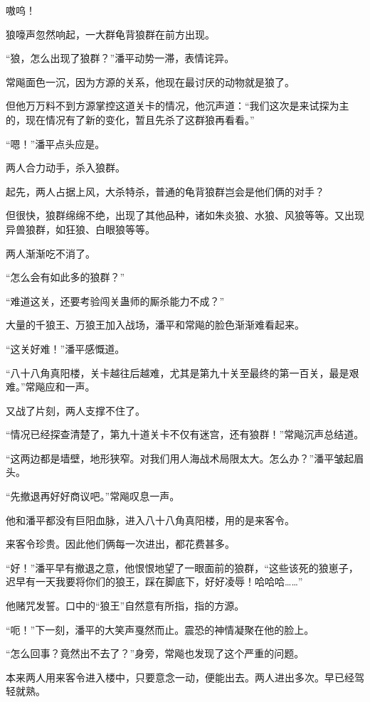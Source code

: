 
\begin{this_body}

嗷呜！

狼嚎声忽然响起，一大群龟背狼群在前方出现。

“狼，怎么出现了狼群？”潘平动势一滞，表情诧异。

常飚面色一沉，因为方源的关系，他现在最讨厌的动物就是狼了。

但他万万料不到方源掌控这道关卡的情况，他沉声道：“我们这次是来试探为主的，现在情况有了新的变化，暂且先杀了这群狼再看看。”

“嗯！”潘平点头应是。

两人合力动手，杀入狼群。

起先，两人占据上风，大杀特杀，普通的龟背狼群岂会是他们俩的对手？

但很快，狼群绵绵不绝，出现了其他品种，诸如朱炎狼、水狼、风狼等等。又出现异兽狼群，如狂狼、白眼狼等等。

两人渐渐吃不消了。

“怎么会有如此多的狼群？”

“难道这关，还要考验闯关蛊师的厮杀能力不成？”

大量的千狼王、万狼王加入战场，潘平和常飚的脸色渐渐难看起来。

“这关好难！”潘平感慨道。

“八十八角真阳楼，关卡越往后越难，尤其是第九十关至最终的第一百关，最是艰难。”常飚应和一声。

又战了片刻，两人支撑不住了。

“情况已经探查清楚了，第九十道关卡不仅有迷宫，还有狼群！”常飚沉声总结道。

“这两边都是墙壁，地形狭窄。对我们用人海战术局限太大。怎么办？”潘平皱起眉头。

“先撤退再好好商议吧。”常飚叹息一声。

他和潘平都没有巨阳血脉，进入八十八角真阳楼，用的是来客令。

来客令珍贵。因此他们俩每一次进出，都花费甚多。

“好！”潘平早有撤退之意，他恨恨地望了一眼面前的狼群，“这些该死的狼崽子，迟早有一天我要将你们的狼王，踩在脚底下，好好凌辱！哈哈哈……”

他赌咒发誓。口中的“狼王”自然意有所指，指的方源。

“呃！”下一刻，潘平的大笑声戛然而止。震恐的神情凝聚在他的脸上。

“怎么回事？竟然出不去了？”身旁，常飚也发现了这个严重的问题。

本来两人用来客令进入楼中，只要意念一动，便能出去。两人进出多次。早已经驾轻就熟。


\end{this_body}

